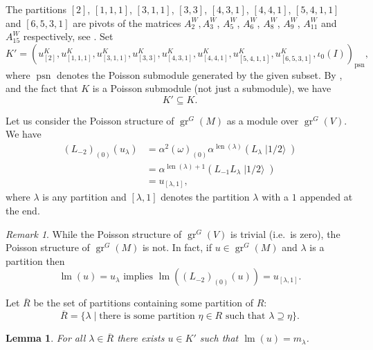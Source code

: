 \documentclass[a4paper, 12pt, reqno]{amsart}
\newtheorem{lemma}[theorem]{Lemma}
\theoremstyle{remark}
\newtheorem{remark}[theorem]{Remark}
\numberwithin{equation}{subsection}
\DeclareMathOperator{\gr}{gr}
\DeclareMathOperator{\lm}{lm}
\DeclareMathOperator{\len}{len}
\DeclareMathOperator{\psn}{psn}
\DeclareMathOperator{\vachalf}{|1/2\rangle}
\begin{document}
The partitions $[2]$, $[1, 1, 1]$, $[3, 1, 1]$, $[3, 3]$, $[4, 3, 1]$, $[4, 4, 1]$, $[5, 4, 1, 1]$ and $[6, 5, 3, 1]$ are pivots of the matrices $A^W_2, A^W_3$, $A^W_5$, $A^W_6$, $A^W_8$, $A^W_9$, $A^W_{11}$ and $A^W_{15}$ respectively, see \cite[ising-modules.ipynb]{sagemath2}.
Set
\begin{equation*}
  K' = (u^K_{[2]}, u^K_{[1, 1, 1]}, u^K_{[3, 1, 1]}, u^K_{[3, 3]}, u^K_{[4, 3, 1]}, u^K_{[4, 4, 1]}, u^K_{[5, 4, 1, 1]}, u^K_{[6, 5, 3, 1]}, \iota_0(I))_{\psn},
\end{equation*}
where $\psn$ denotes the Poisson submodule generated by the given subset.
By ,  and the fact that $K$ is a Poisson submodule (not just a submodule), we have
\begin{equation*}
K' \subseteq K.
\end{equation*}

Let us consider the Poisson structure of $\gr^G(M)$ as a module over $\gr^G(V)$.
We have
\begin{align*}
  (L_{-2})_{(0)}(u_{\lambda}) &= \alpha^2(\omega)_{(0)}\alpha^{\len(\lambda)}(L_{\lambda}\vachalf) \\
  &= \alpha^{\len(\lambda) + 1}(L_{-1}L_{\lambda}\vachalf) \\
  &= u_{[\lambda, 1]},
\end{align*}
where $\lambda$ is any partition and $[\lambda, 1]$ denotes the partition $\lambda$ with a $1$ appended at the end.

\begin{remark}
  \label{rmk:38}
  While the Poisson structure of $\gr^G(V)$ is trivial (i.e.\ is zero), the Poisson structure of $\gr^G(M)$ is not.
  In fact, if $u \in \gr^G(M)$ and $\lambda$ is a partition then
  \begin{equation*}
    \lm(u) = u_\lambda\text{ implies }\lm((L_{-2})_{(0)}(u)) = u_{[\lambda, 1]}.
  \end{equation*}
\end{remark}

Let $\overline{R}$ be the set of partitions containing some partition of $R$:
\begin{equation*}
  \overline{R} = \{\lambda \mid \text{there is some partition }\eta \in R\text{ such that }\lambda \supseteq \eta\}.
\end{equation*}

\begin{lemma}
  \label{lmm:30}
  For all $\lambda \in \overline{R}$ there exists $u \in K'$ such that $\lm(u) = m_\lambda$.
\end{lemma}
\end{document}
